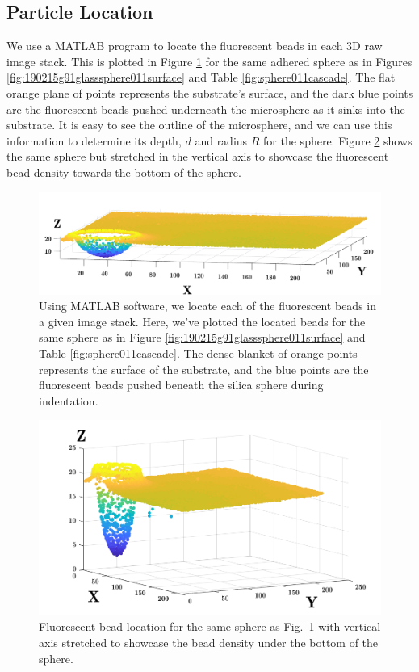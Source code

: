 \subsection{Particle Location}
We use a MATLAB program to locate the fluorescent beads in each 3D raw image stack. This is plotted in Figure \ref{fig:particlelocatednormalized} for the same adhered sphere as in Figures \ref{fig:190215g91glasssphere011surface} and Table \ref{fig:sphere011cascade}. The flat orange plane of points represents the substrate's surface, and the dark blue points are the fluorescent beads pushed underneath the microsphere as it sinks into the substrate. It is easy to see the outline of the microsphere, and we can use this information to determine its depth, $ d $ and radius $ R $ for the sphere. 
Figure \ref{fig:particlelocatedstretched} shows the same sphere but stretched in the vertical axis to showcase the fluorescent bead density towards the bottom of the sphere. 
\begin{figure}[h]
	\centering
	\includegraphics[width=\linewidth]{Chapters/Figures/sphere011_ia/particle_located_normalized}
	\caption[Particle Located: Normalized-Axes]{Using MATLAB software, we locate each of the fluorescent beads in a given image stack. Here, we've plotted the located beads for the same sphere as in Figure \ref{fig:190215g91glasssphere011surface} and Table \ref{fig:sphere011cascade}. The dense blanket of orange points represents the surface of the substrate, and the blue points are the fluorescent beads pushed beneath the silica sphere during indentation.}
	\label{fig:particlelocatednormalized}
\end{figure}


\begin{figure}[h!]
	\centering
	\includegraphics[width=\linewidth]{Chapters/Figures/sphere011_ia/particle_located_stretched}
	\caption[Particle Located: Stretched-Axes]{Fluorescent bead location for the same sphere as Fig.~\ref{fig:particlelocatednormalized} with vertical axis stretched to showcase the bead density under the bottom of the sphere.}
	\label{fig:particlelocatedstretched}
\end{figure}

